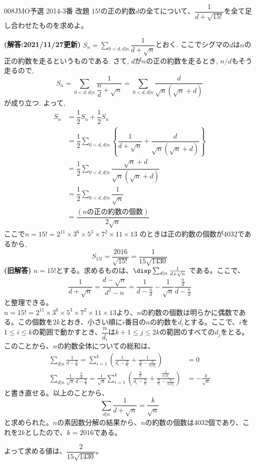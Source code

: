 \begin{thm}{008}{}{JMO予選 2014-3番 改題}
 $15!$の正の約数$d$の全てについて、$\dfrac{1}{d+\sqrt{15!}}$を全て足し合わせたものを求めよ。
\end{thm}
\textbf{(解答:2021/11/27更新)} 
$S_n = \sum_{0<d, d|n}\dfrac{1}{d+\sqrt{n}}$とおく. ここでシグマの$d$は$n$の正の約数を走るというものである. さて, $d$が$n$の正の約数を走るとき, $n/d$もそう走るので, 
\[S_n = \sum_{0<d, d|n} \dfrac{1}{\dfrac{n}{d} + \sqrt{n}} = \sum_{0<d, d|n} \dfrac{d}{\sqrt{n}(\sqrt{n}+d)} \]
が成り立つ. よって, 
\begin{align*}
S_n &= \dfrac{1}{2}S_n + \dfrac{1}{2} S_n \\
&= \dfrac{1}{2}\sum_{0<d, d|n} \left\{ \dfrac{1}{d+\sqrt{n}} + \dfrac{d}{\sqrt{n}(\sqrt{n} + d)} \right\} \\
&= \dfrac{1}{2}\sum_{0<d, d|n} \dfrac{\sqrt{n} + d}{\sqrt{n}(\sqrt{n} + d)}\\
&= \dfrac{1}{2}\sum_{0<d, d|n} \dfrac{1}{\sqrt{n}} \\
&= \dfrac{(nの正の約数の個数)}{2\sqrt{n}}
\end{align*}
ここで$n=15! = 2^11\times 3^6\times 5^3 \times 7^2\times 11\times 13$ のときは正の約数の個数が4032であるから, 
\[S_{15!} = \dfrac{2016}{\sqrt{15!}} = \dfrac{1}{15\sqrt{1430}}\]
\textbf{(旧解答)}
$n=15!$とする。求めるものは、$\disp \sum_{d|n}\frac{1}{d+\sqrt{n}}$ である。ここで、
\[ \frac{1}{d+\sqrt{n}} = \frac{d-\sqrt{n}}{d^2-n} = \frac{1}{d-\frac{n}{d}}-\frac{1}{\sqrt{n}}\frac{\frac{n}{d}}{d-\frac{n}{d}} \]
と整理できる。\\
$n=15!=2^{11}\times 3^6\times 5^3\times 7^2\times 11\times 13$より、$n$の約数の個数は明らかに偶数である。この個数を$2k$とおき、小さい順に$i$番目の$n$の約数を$d_i$とする。ここで、$i$を$1\le i \le k$の範囲で動かすとき、$\dfrac{n}{d_i}$は$k+1\le j \le 2k$の範囲のすべての$d_j$をとる。このことから、$n$の約数全体についての総和は、
\begin{align*}
 \sum_{d|n} \frac{1}{d-\frac{n}{d}}=\sum_{i=1}^k \left(\frac{1}{d_i-\frac{n}{d_i}}+\frac{1}{\frac{n}{d_i}-\frac{n}{n/d_i}}\right) &= 0 \\
 \sum_{d|n} \frac{1}{\sqrt{n}}\frac{\frac{n}{d}}{d-\frac{n}{d}} = \frac{1}{\sqrt{n}} \sum_{i=1}^k \left(\frac{\frac{n}{d_i}}{d_i-\frac{n}{d_i}} + \frac{\frac{n}{n/d_i}}{\frac{n}{d_i}-\frac{n}{n/d_i}}\right) &= -\frac{k}{\sqrt{n}} 
\end{align*}
と書き直せる。以上のことから、
\[ \sum_{d|n}\frac{1}{d+\sqrt{n}} = \frac{k}{\sqrt{n}} \]
と求められた。$n$の素因数分解の結果から、$n$の約数の個数は4032個であり、これを$2k$としたので、$k=2016$である。

よって求める値は、\textbf{$\dfrac{2}{15\sqrt{1430}}$}。